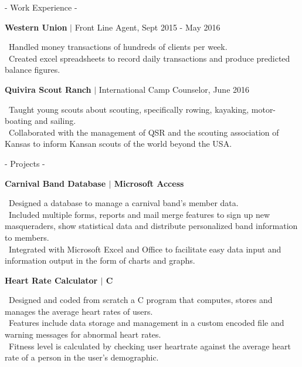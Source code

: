 \documentclass{article}
\begin{document}
\hfill
\begin{minipage}[t]{0.63\textwidth}

{\LARGE\sc - Work Experience -} \smallskip\par
{\large\sffamily\bf Western Union} $|$
{\small\sffamily\lsstyle Front Line Agent, Sept 2015 - May 2016} \par
{\small{}\selectfont\textbullet\ Handled money transactions of hundreds of clients per week.\\
\textbullet\ Created excel spreadsheets to record daily transactions and produce predicted balance figures.}
\smallskip

{\large\sffamily\bf Quivira Scout Ranch} $|$
{\small\sffamily\lsstyle International Camp Counselor, June 2016} \par
{\small{}\selectfont\textbullet\ Taught young scouts about scouting, specifically rowing, kayaking, motor-boating and sailing.
\\\textbullet\  Collaborated with the management of QSR and the scouting association of Kansas to inform Kansan scouts of the world beyond the USA.} \par
\bigskip

{\LARGE\sc - Projects -} \smallskip\par
{\sffamily\bf\small {\large Carnival Band Database $|$} Microsoft Access}\par
{\small{}\selectfont\textbullet\ Designed a database to manage a carnival band's member data.\\
\textbullet\ Included multiple forms, reports and mail merge features to sign up new masqueraders, show statistical data and distribute personalized band information to members.\\
\textbullet\ Integrated with Microsoft Excel and Office to facilitate easy data input and information output in the form of charts and graphs.}
\medskip

{\sffamily\bf\small {\large Heart Rate Calculator $|$} C}\par
{\small{}\selectfont\textbullet\ Designed and coded from scratch a C program that computes, stores and manages the average heart rates of users. \\
\textbullet\ Features include data storage and management in a custom encoded file and warning messages for abnormal heart rates.\\
\textbullet\ Fitness level is calculated by checking user heartrate against the average heart rate of a person in the user's demographic.}\par
\medskip


\end{minipage}
\end{document}
